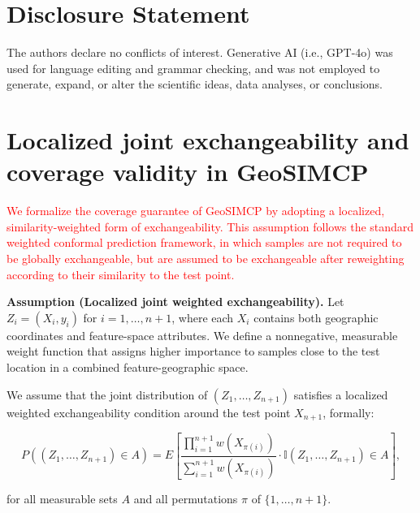 \documentclass[authoryear,preprint,review,12pt]{elsarticle}
\begin{document}

\section{Disclosure Statement}

The authors declare no conflicts of interest. Generative AI (i.e., GPT-4o) was used for language editing and grammar checking, and was not employed to generate, expand, or alter the scientific ideas, data analyses, or conclusions.


\appendix
\renewcommand{\thefigure}{S\arabic{figure}}
\setcounter{figure}{0}


\section{Localized joint exchangeability and coverage validity in GeoSIMCP}


 
\textcolor{red}{We formalize the coverage guarantee of GeoSIMCP by adopting a localized, similarity-weighted form of exchangeability. This assumption follows the standard weighted conformal prediction framework, in which samples are not required to be globally exchangeable, but are assumed to be exchangeable after reweighting according to their similarity to the test point.}


\textbf{Assumption (Localized joint weighted exchangeability).}  
Let \(Z_i = (X_i, y_i)\) for \(i=1, \dots, n+1\), where each \(X_i\) contains both geographic coordinates and feature-space attributes. We define a nonnegative, measurable weight function that assigns higher importance to samples close to the test location in a combined feature-geographic space.  

We assume that the joint distribution of \((Z_1, \dots, Z_{n+1})\) satisfies a localized weighted exchangeability condition around the test point \(X_{n+1}\), formally:


\begin{equation} P((Z_1, \dots, Z_{n+1}) \in A) = E\left[ \frac{ \prod_{i=1}^{n+1} w(X_{\pi(i)}) }{ \sum_{i=1}^{n+1} w(X_{\pi(i)}) } \cdot \mathbb{I}{(Z_1, \dots, Z_{n+1}) \in A} \right], 
\end{equation}

for all measurable sets \(A\) and all permutations \(\pi\) of \(\{1, \dots, n+1\}\).
\end{document}
